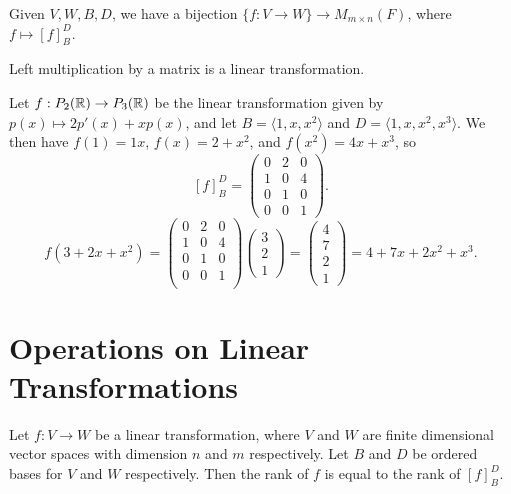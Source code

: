 \begin{rmk}
    Given $V, W, B, D$, we have a bijection $\{f: V \to W\} \to M_{m \times n}(F)$, where $f \mapsto [f]_B^D$.
\end{rmk}

\begin{cor}
    Left multiplication by a matrix is a linear transformation.
\end{cor}

\begin{exmp}
    Let $f: P_2(\mathbb{R}) \to P_3(\mathbb{R})$ be the linear transformation given by $p(x) \mapsto 2p'(x) + xp(x)$, and let $B = \langle 1, x, x^2\rangle$ and $D = \langle 1, x, x^2, x^3\rangle$. We then have $f(1) = 1x$, $f(x) = 2 + x^2$, and $f(x^2) = 4x + x^3$, so
    \[[f]_B^D = \begin{pmatrix}
        0 & 2 & 0 \\ 1 & 0 & 4 \\ 0 & 1 & 0 \\ 0 & 0 & 1
    \end{pmatrix}.\]
    \[f(3 + 2x + x^2) = \begin{pmatrix}
        0 & 2 & 0\\
        1 & 0 & 4\\
        0 & 1 & 0\\
        0 & 0 & 1\\
    \end{pmatrix}\begin{pmatrix}
        3 \\ 2 \\ 1
    \end{pmatrix} = \begin{pmatrix}
        4 \\ 7 \\ 2 \\ 1
    \end{pmatrix} = 4 + 7x + 2x^2 + x^3.\]
\end{exmp}

\section{Operations on Linear Transformations}

\begin{thm}\label{transformation-matrix-rank-equality}
    Let $f: V \to W$ be a linear transformation, where $V$ and $W$ are finite dimensional vector spaces with dimension $n$ and $m$ respectively. Let $B$ and $D$ be ordered bases for $V$ and $W$ respectively. Then the rank of $f$ is equal to the rank of $[f]_B^D$.
\end{thm}

